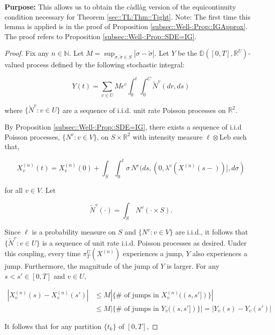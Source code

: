 \documentclass[12pt]{article}
\newcommand{\mb}{\mathbb}
\newcommand{\te}{\text}
\newcommand{\ep}{\epsilon}
\newcommand{\purpose}{\textbf{Purpose: }}
\newcommand{\ind}{\hspace{24pt}}
\newcommand{\cad}{\mb{D}}							%
\renewcommand{\v}{v}							%
\renewcommand{\U}{U}							%
\renewcommand{\S}{S}							%
\newcommand{\s}{\sigma}							%
\newcommand{\ev}{\ep}							%
\newcommand{\T}{T}								%
\renewcommand{\t}{t}							%
\newcommand{\proj}{\pi}							%
\renewcommand{\tt}{s}							%
\newcommand{\ttt}{s'}							%
\newcommand{\X}{X}								%
\newcommand{\vind}[1]{^{#1}}					%
\newcommand{\vsi}[1]{^{#1}}						%
\newcommand{\cind}[1]{_{#1}}					%
\newcommand{\tp}[1]{(#1)}						%
\newcommand{\ts}[1]{_{#1}}						%
\newcommand{\const}{C}							%
\newcommand{\sln}[1]{^{(#1)}}					%
\renewcommand{\ss}{\tilde{\s}}					%
\newcommand{\poiss}{N}							%
\newcommand{\leb}{\te{Leb}}						%
\newcommand{\Sm}{\ell}							%
\newcommand{\rate}{\lambda}						%
\renewcommand{\r}{r}							%
\newcommand{\cconst}{M}							%
\newcommand{\alt}[1]{\widetilde{#1}}			%
\newcommand{\indx}[1]{_{#1}}					%
\newcommand{\XX}{Y}								%
\renewcommand{\it}{k}							%
\begin{document}
\purpose This allows us to obtain the c\`adl\`ag version of the equicontinuity condition necessary for Theorem \ref{sec::TL:Thm::Tight}. Note: The first time this lemma is applied is in the proof of Proposition \ref{subsec::Well-:Prop::IGApprox}. The proof refers to Proposition \ref{subsec::Well-:Prop::SDE=IG}.

\begin{proof}
Fix any \(n \in \mb{N}\). Let \(\cconst = \sup_{\s,\ss \in \S} |\s - \ss|\). Let \(\XX\) be the \(\cad([0,\T],\mb{R}^\U)\)-valued process defined by the following stochastic integral:

\[\XX\tp{\t} = \sum_{\v \in \U}\cconst\ev\vind{\v}\int_0^\t\int_0^{\const}\alt{\poiss}\vind{\v}(d\r, d\tt)\]

where \(\{\alt{\poiss}\vind{\v}:\v \in \U\}\) are a sequence of i.i.d. unit rate Poisson processes on \(\mb{R}^2\). 

\ind By Proposition \ref{subsec::Well-:Prop::SDE=IG}, there exists a sequence of i.i.d Poisson processes, \(\{\poiss\vind{\v}:\v\in V\}\), on \(\S\times\mb{R}^2\) with intensity measure \(\Sm\otimes \leb\) such that,

\[\X\sln{n}\cind{\v}\tp{\t} = \X\sln{n}\cind{\v}\tp{0} + \int_\S\int_0^\t \s\,\poiss\vind{\v}(d\tt,(0,\rate\vind{\v}(\X\sln{n}\tp{\tt-})],d\s)\]

for all \(\v\in V\). Let

\[\alt{\poiss}\vind{\v}(\cdot) = \int_\S\,\poiss\vind{\v}(\cdot\times \S).\]

Since \(\Sm\) is a probability measure on \(\S\) and \(\{\poiss\vind{\v}:\v\in V\}\) are i.i.d., it follows that \(\{\alt{\poiss}\vind{\v}:\v\in \U\}\) is a sequence of unit rate i.i.d. Poisson processes as desired. Under this coupling, every time \(\proj\vsi{\U}\ts{\T}(\X\sln{n})\) experiences a jump, \(\XX\) also experiences a jump. Furthermore, the magnitude of the jump of \(\XX\) is larger. For any \(\tt<\ttt\in [0,\T]\) and \(\v\in \U\),

\begin{align*}
|\X\sln{n}\cind{\v}\tp{\tt} - \X\sln{n}\cind{\v}\tp{\ttt}|&\leq \cconst\left|\{\#\te{ of jumps in }\X\sln{n}\cind{\v}\tp{(\tt,\ttt]}\}\right| \\
&\leq \cconst\left|\{\#\te{ of jumps in }\XX\cind{\v}\tp{(\tt,\ttt]}\}\right| = \left|\XX\cind{\v}\tp{\tt} - \XX\cind{\v}\tp{\ttt}\right|
\end{align*}

It follows that for any partition \(\{\t\indx{\it}\}\) of \([0,\T]\),


\end{proof}
\end{document}
